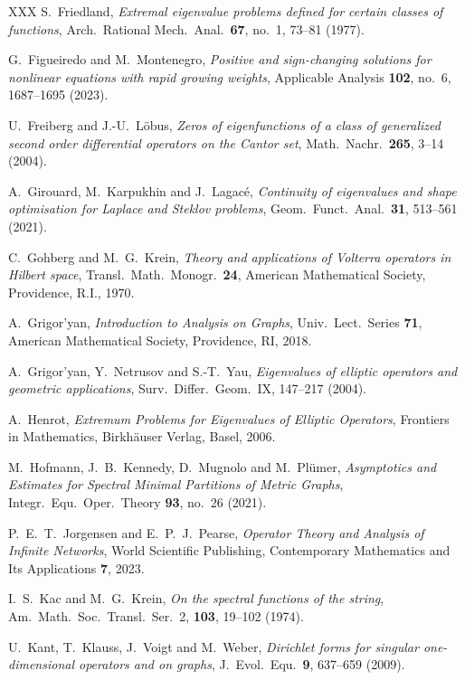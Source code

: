\documentclass[reqno]{amsart}
\theoremstyle{plain}
\theoremstyle{definition}
\theoremstyle{remark}
\numberwithin{equation}{section}
\begin{document}
\begin{thebibliography}{XXX}
	S.\ Friedland, {\em Extremal eigenvalue problems defined for certain classes of functions}, Arch.\ Rational Mech.\ Anal.\ \textbf{67}, no.~1, 73--81 (1977).	

	
	G.\ Figueiredo and M.\ Montenegro, {\em Positive and sign-changing solutions for nonlinear equations with rapid growing weights}, Applicable Analysis \textbf{102}, no.~6, 1687--1695 (2023).
	
	U.\ Freiberg and J.-U.\ Löbus, {\em Zeros of eigenfunctions of a class of generalized second order differential operators on the Cantor set}, Math.\ Nachr.\ \textbf{265}, 3--14 (2004).
	
	
	A.\ Girouard, M.\ Karpukhin and J.\ Lagacé, {\em Continuity of eigenvalues and shape optimisation for Laplace and Steklov problems}, Geom.\ Funct.\ Anal.\ {\bf 31}, 513--561 (2021).
	
	C.\ Gohberg and M.\ G.\ Krein, {\em Theory and applications of Volterra operators in Hilbert space}, Transl.\ Math.\ Monogr.\ \textbf{24}, American Mathematical Society, Providence, R.I., 1970.
	
	A.\ Grigor'yan, {\em Introduction to Analysis on Graphs}, Univ.\ Lect.\ Series {\bf 71}, American Mathematical Society, Providence, RI, 2018.
	
	
	A.\ Grigor’yan, Y.\ Netrusov and S.-T.\ Yau, {\em Eigenvalues of elliptic operators and geometric applications}, Surv.\ Differ.\ Geom.\ IX, 147--217 (2004).
	
	A.\ Henrot, {\em Extremum Problems for Eigenvalues of Elliptic Operators}, Frontiers in Mathematics, Birkhäuser Verlag, Basel, 2006.
	
	M.\ Hofmann, J.\ B.\ Kennedy, D.\ Mugnolo and M.\ Plümer, {\em Asymptotics and Estimates for Spectral Minimal Partitions of Metric Graphs}, Integr.\ Equ.\ Oper.\ Theory \textbf{93}, no.~26 (2021).
	
	
	P.\ E.\ T.\ Jorgensen and E.\ P.\ J.\ Pearse, {\em Operator Theory and Analysis of Infinite Networks}, World Scientific Publishing, Contemporary Mathematics and Its Applications \textbf{7}, 2023.
	
	I.\ S.\ Kac and M.\ G.\ Krein, {\em On the spectral functions of the string}, Am.\ Math.\ Soc.\ Transl.\ Ser.\ 2, \textbf{103}, 19--102 (1974).
	
	U.\ Kant, T.\ Klauss, J.\ Voigt and M.\ Weber, {\em Dirichlet forms for singular one-dimensional operators and on graphs}, J.\ Evol.\ Equ.\ \textbf{9}, 637--659 (2009).
	

\end{thebibliography}
\end{document}
